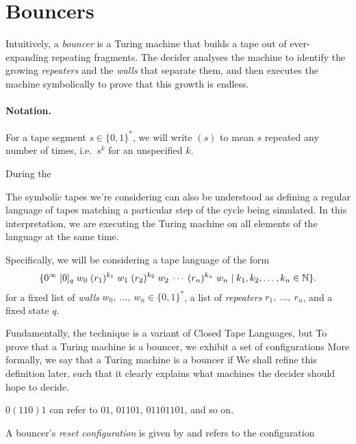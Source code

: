 
\section{Bouncers}\label{sec:bouncers}

Intuitively, a \emph{bouncer} is a Turing machine that builds a tape out of
ever-expanding repeating fragments. The decider analyses the machine to
identify the growing \emph{repeaters} and the \emph{walls} that separate them,
and then executes the machine symbolically to prove that this growth is endless.

\paragraph{Notation.} For a tape segment $s \in \{0, 1\}^*$, we will
write $(s)$ to mean $s$ repeated any number of times, i.e.~$s^k$ for
an unspecified $k$.

During the 


\begin{remark} The symbolic tapes we're considering can also be understood as
defining a regular language of tapes matching a particular step of the cycle
being simulated. In this interpretation, we are executing the Turing machine
on all elements of the language at the same time.
\end{remark}

Specifically, we will be considering
a tape language of the form
\begin{equation}
    \{
    0^\infty\; [0]_q\; w_0\; (r_1)^{k_1}\; w_1\; (r_2)^{k_2}\; w_2\: \cdots\: (r_n)^{k_n}\; w_n
    \mid k_1, k_2, \ldots, k_n \in \mathbb{N}
    \}.
\end{equation}
for a fixed list of \emph{walls} $w_0,\ \ldots,\ w_n \in \{0, 1\}^*$,
a list of \emph{repeaters} $r_1,\ \ldots,\ r_n$, and a fixed state $q$.

Fundamentally, the technique is a variant
of Closed Tape Languages, but 
To prove that a Turing machine is a bouncer,
we exhibit a set of configurations
More formally, we say that a Turing machine
is a bouncer if
We shall refine this definition later,
such that it clearly explains what machines the decider should hope to decide.


\begin{example}
    $0(110)1$ can refer to $01$, $01101$, $01101101$, and so on.
\end{example}

\begin{definition}
    A bouncer's \emph{reset configuration} is given by
    and refers to the configuration
\end{definition}

